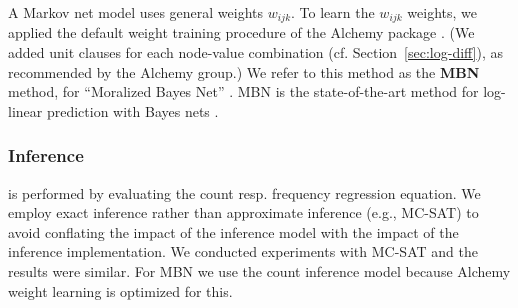 \documentclass[twoside,leqno,twocolumn]{article}
\begin{document}
A Markov net model uses general weights $w_{ijk}$.
To learn the $w_{ijk}$ weights, we applied the default weight training procedure \cite{Lowd2007} of the Alchemy package \cite{Kok2009a}. (We added unit clauses for each node-value combination (cf. Section~\ref{sec:log-diff}), as recommended by the Alchemy group.)  We refer to this method as the \textbf{MBN} method, for ``Moralized Bayes Net''   \cite{Khosravi2010}. 
MBN is the state-of-the-art method for log-linear prediction with Bayes nets \cite{Schulte2012}.

\subsubsection{Inference}
is performed by evaluating the count resp. frequency regression equation. We employ exact inference rather than approximate inference (e.g., MC-SAT) to avoid conflating the impact of the inference model with the impact of the inference implementation. We conducted experiments with MC-SAT and the results were similar. For MBN we use the count inference model because Alchemy weight learning is optimized for this.

%
%
%
%
%
\end{document}
